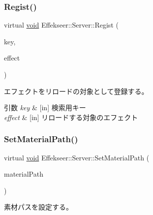 \subsubsection{\texorpdfstring{Regist()}{Regist()}}
{\footnotesize\ttfamily virtual \mbox{\hyperlink{namespace_effekseer_ab34c4088e512200cf4c2716f168deb56}{void}} Effekseer\+::\+Server\+::\+Regist (\begin{DoxyParamCaption}\item[{const \mbox{\hyperlink{_effekseer_8h_a50b026abea014b47854bcd835b3b6233}{E\+F\+K\+\_\+\+C\+H\+AR}} $\ast$}]{key,  }\item[{\mbox{\hyperlink{class_effekseer_1_1_effect}{Effect}} $\ast$}]{effect }\end{DoxyParamCaption})\hspace{0.3cm}{\ttfamily [pure virtual]}}



エフェクトをリロードの対象として登録する。 


\begin{DoxyParams}{引数}
{\em key} & \mbox{[}in\mbox{]} 検索用キー \\
\hline
{\em effect} & \mbox{[}in\mbox{]} リロードする対象のエフェクト \\
\hline
\end{DoxyParams}
\mbox{\label{class_effekseer_1_1_server_a4c0d31a5fd39184615179157a6929296}} 
\subsubsection{\texorpdfstring{Set\+Material\+Path()}{SetMaterialPath()}}
{\footnotesize\ttfamily virtual \mbox{\hyperlink{namespace_effekseer_ab34c4088e512200cf4c2716f168deb56}{void}} Effekseer\+::\+Server\+::\+Set\+Material\+Path (\begin{DoxyParamCaption}\item[{const \mbox{\hyperlink{_effekseer_8h_a50b026abea014b47854bcd835b3b6233}{E\+F\+K\+\_\+\+C\+H\+AR}} $\ast$}]{material\+Path }\end{DoxyParamCaption})\hspace{0.3cm}{\ttfamily [pure virtual]}}



素材パスを設定する。 

